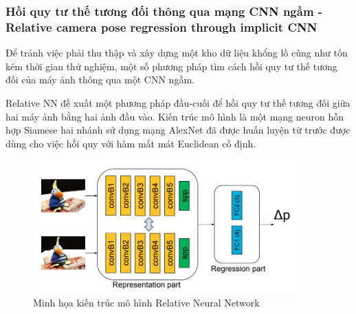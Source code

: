 \subsubsection*{Hồi quy tư thế tương đối thông qua mạng CNN ngầm - Relative camera pose regression through implicit CNN}
Để tránh việc phải thu thập và xây dựng một kho dữ liệu khổng lồ cũng như tốn kém thời gian thử nghiệm, một số phương pháp tìm cách hồi quy tư thế tương đối của máy ảnh thông qua một CNN ngầm.

Relative NN \cite{melekhov2017relative} đề xuất một phương pháp đầu-cuối để hồi quy tư thế tương đối giữa hai máy ảnh bằng hai ảnh đầu vào. Kiến trúc mô hình là một mạng neuron hỗn hợp Siamese hai nhánh sử dụng mạng AlexNet đã được huấn luyện từ trước được dùng cho việc hồi quy với hàm mất mát Euclidean cố định.
\begin{figure}[H]
    \centering
    \includegraphics[width=0.9\textwidth]{pics/Chapter2/relativenn.png}
    \caption{Minh họa kiến trúc mô hình Relative Neural Network \cite{melekhov2017relative}}
\end{figure}

